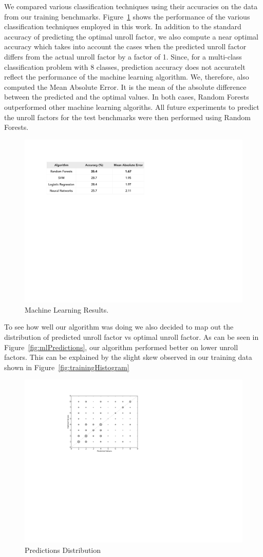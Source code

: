 \documentclass[]{sig-alternate}
\begin{document}
We compared various classification techniques using their accuracies on the data from our training benchmarks. Figure~\ref{fig:mlResults} shows the performance of the various classification techniques employed in this work. In addition to the standard accuracy of predicting the optimal unroll factor, we also compute a near optimal accuracy which takes into account the cases when the predicted unroll factor differs from the actual unroll factor by a factor of 1. Since, for a multi-class classification problem with 8 classes, prediction accuracy does not accuratelt reflect the performance of the machine learning algorithm. We, therefore, also computed the Mean Absolute Error. It is the mean of the absolute difference between the predicted and the optimal values. In both cases, Random Forests outperformed other machine learning algoriths. All future experiments to predict the unroll factors for the test benchmarks were then performed using Random Forests.

\begin{figure}
  \includegraphics[width=0.\linewidth]{fig/mlResults.pdf}
  \caption{Machine Learning Results.}
  \label{fig:mlResults}
\end{figure}

To see how well our algorithm was doing we also decided to map out the distribution of predicted unroll factor vs optimal unroll factor. As can be seen in Figure~\ref{fig:mlPredictions}, our algorithm performed better on lower unroll factors. This can be explained by the slight skew observed in our training data shown in Figure~\ref{fig:trainingHistogram}

\begin{figure}
  \center
  \includegraphics[width=0.90\linewidth]{fig/mlPredictions.pdf}
  \caption{Predictions Distribution}
  \label{fig:cfpResults}
\end{figure}
\end{document}

